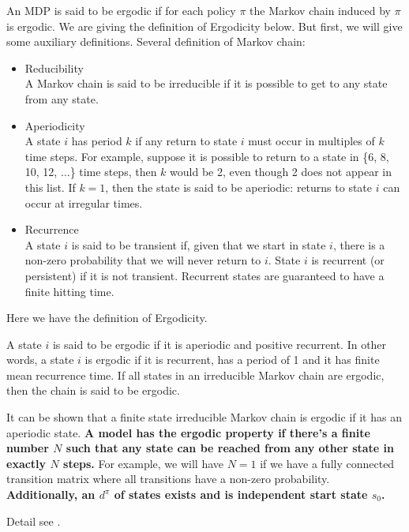 \documentclass[9pt]{article}
\begin{document}
An MDP is said to be ergodic if for each policy $\pi$ the Markov chain induced by $\pi$ is ergodic.
We are giving the definition of Ergodicity below. But first, we will give some auxiliary definitions.
Several definition of Markov chain:
\begin{itemize}
\item Reducibility\\
A Markov chain is said to be irreducible if it is possible to get to any state from any state.
\item Aperiodicity\\
A state $i$ has period $k$ if any return to state $i$ must occur in multiples of $k$ time steps. For example, suppose it is possible to return to a state in \{6, 8, 10, 12, $\ldots$\} time steps, then $k$ would be 2, even though 2 does not appear in this list. If $k = 1$, then the state is said to be aperiodic: returns to state $i$ can occur at irregular times.
\item Recurrence\\
A state $i$ is said to be transient if, given that we start in state $i$, there is a non-zero probability that we will never return to $i$. State $i$ is recurrent (or persistent) if it is not transient. Recurrent states are guaranteed to have a finite hitting time.
\end{itemize}
Here we have the definition of Ergodicity.

A state $i$ is said to be ergodic if it is aperiodic and positive recurrent. In other words, a state $i$ is ergodic if it is recurrent, has a period of 1 and it has finite mean recurrence time. If all states in an irreducible Markov chain are ergodic, then the chain is said to be ergodic.

It can be shown that a finite state irreducible Markov chain is ergodic if it has an aperiodic state. {\bf A model has the ergodic property if there's a finite number $N$ such that any state can be reached from any other state in exactly $N$ steps.} For example, we will have $N=1$ if we have a fully connected transition matrix where all transitions have a non-zero probability.
{\bf Additionally, an  $d^{\pi}$ of states exists and is independent start state $s_0$.}

Detail see \citep{ortner2007linear}.

 \citep{Vanseijen2015Deeper} \citep{Riedmiller2005Neural}
\end{document}

